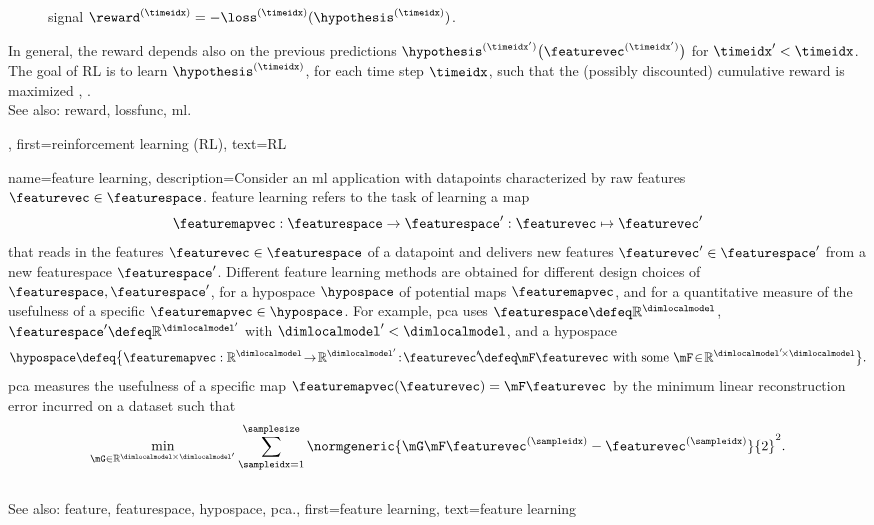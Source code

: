 {{\begin{figure}[H]
\begin{center}
{		signal $\reward^{(\timeidx)}=-\loss^{(\timeidx)}(\hypothesis^{(\timeidx)})$. \label{fig_reinforcementlearning_dict}}
		\end{center}
		\end{figure}
		In general, the \gls{reward} depends also on the 
		previous \glspl{prediction} $\hypothesis^{(\timeidx')}\big(\featurevec^{(\timeidx')}\big)$ 
		for $\timeidx' < \timeidx$. The goal of RL is to learn $\hypothesis^{(\timeidx)}$, for 
		each time step $\timeidx$, such that the (possibly discounted) cumulative \gls{reward} 
		is maximized \cite{MLBasics}, \cite{SuttonEd2}.
		\\
		See also: \gls{reward}, \gls{lossfunc}, \gls{ml}.},
	first={reinforcement learning (RL)},
	text={RL}
}


{name={feature learning},
	description={Consider an \gls{ml} application with \glspl{datapoint} characterized by 
		raw \glspl{feature} $\featurevec \in \featurespace$. \Gls{feature} learning 
		refers to the task of learning a \gls{map} 
		$$\featuremapvec: \featurespace \rightarrow \featurespace': \featurevec \mapsto \featurevec'$$ 
		that reads in the \glspl{feature} $\featurevec \in \featurespace$ of a \gls{datapoint} and delivers new 
		\glspl{feature} $\featurevec' \in \featurespace'$ from a new \gls{featurespace} $\featurespace'$. 
		Different \gls{feature} learning methods are obtained for different design 
		choices of $\featurespace,\featurespace'$, for a \gls{hypospace} $\hypospace$ 
		of potential \glspl{map} $\featuremapvec$, and for a quantitative measure of the usefulness of 
		a specific $\featuremapvec \in \hypospace$. For example, \gls{pca} 
		uses $\featurespace \defeq \mathbb{R}^{\dimlocalmodel}$, $\featurespace' \defeq \mathbb{R}^{\dimlocalmodel'}$ 
		with $\dimlocalmodel' < \dimlocalmodel$, and a \gls{hypospace} 
		$$\hypospace\defeq \big\{ \featuremapvec: \mathbb{R}^{\dimlocalmodel}
		\!\rightarrow\! \mathbb{R}^{\dimlocalmodel'}\!:\!\featurevec'\!\defeq\!\mF \featurevec \mbox{ with some } \mF \!\in\! \mathbb{R}^{\dimlocalmodel' \!\times \dimlocalmodel} \big\}.$$ \Gls{pca} measures the usefulness of a specific \gls{map} $\featuremapvec(\featurevec)= \mF \featurevec$ 
	by the \gls{minimum} linear reconstruction error incurred on a \gls{dataset} such that 
$$\min_{\mG \in \mathbb{R}^{\dimlocalmodel \!\!\!\times \dimlocalmodel'}} \sum_{\sampleidx=1}^{\samplesize} \normgeneric{\mG \mF \featurevec^{(\sampleidx)} - \featurevec^{(\sampleidx)}}{2}^{2}.$$ 
			\\ 
		See also: \gls{feature}, \gls{featurespace}, \gls{hypospace}, \gls{pca}.}, 
	first={feature learning},
	text={feature learning}
} 

